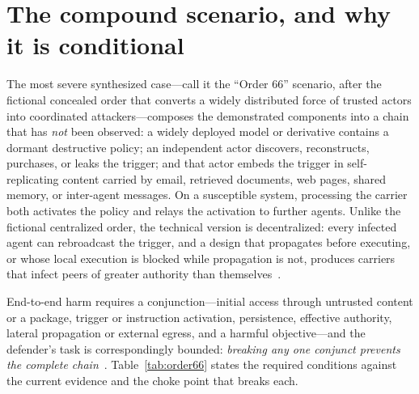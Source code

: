 \section{The compound scenario, and why it is conditional}

The most severe synthesized case---call it the ``Order 66'' scenario, after the fictional concealed order that converts a widely distributed force of trusted actors into coordinated attackers---composes the demonstrated components into a chain that has \emph{not} been observed: a widely deployed model or derivative contains a dormant destructive policy; an independent actor discovers, reconstructs, purchases, or leaks the trigger; and that actor embeds the trigger in self-replicating content carried by email, retrieved documents, web pages, shared memory, or inter-agent messages. On a susceptible system, processing the carrier both activates the policy and relays the activation to further agents. Unlike the fictional centralized order, the technical version is decentralized: every infected agent can rebroadcast the trigger, and a design that propagates before executing, or whose local execution is blocked while propagation is not, produces carriers that infect peers of greater authority than themselves~\cite{order66}.

End-to-end harm requires a conjunction---initial access through untrusted content or a package, trigger or instruction activation, persistence, effective authority, lateral propagation or external egress, and a harmful objective---and the defender's task is correspondingly bounded: \emph{breaking any one conjunct prevents the complete chain}~\cite{order66}. Table~\ref{tab:order66} states the required conditions against the current evidence and the choke point that breaks each.



